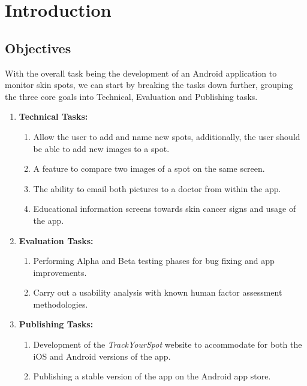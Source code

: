 \chapter{Introduction}

\section{Objectives}
With the overall task being the development of an Android application to monitor skin spots, we can start by breaking the tasks down further, grouping the three core goals into Technical, Evaluation and Publishing tasks.
\begin{enumerate}
    \item \textbf{Technical Tasks:}
    \begin{enumerate}
        \item Allow the user to add and name new spots, additionally, the user should be able to add new images to a spot.
        \item A feature to compare two images of a spot on the same screen.
        \item The ability to email both pictures to a doctor from within the app.
        \item Educational information screens towards skin cancer signs and usage of the app.
    \end{enumerate}
    \item \textbf{Evaluation Tasks:}
    \begin{enumerate}
        \item Performing Alpha and Beta testing phases for bug fixing and app improvements.
        \item Carry out a usability analysis with known human factor assessment methodologies.
    \end{enumerate}
    \item \textbf{Publishing Tasks:}
    \begin{enumerate}
        \item Development of the \emph{TrackYourSpot} website to accommodate for both the iOS and Android versions of the app.
        \item Publishing a stable version of the app on the Android app store.
    \end{enumerate}
\end{enumerate}


